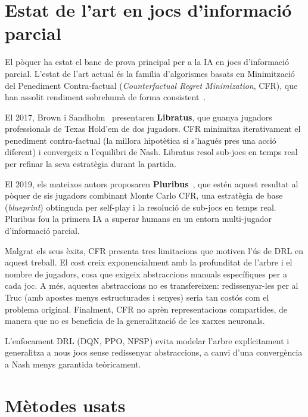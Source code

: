 \section{Estat de l'art en jocs d'informació parcial}
\label{sec:estat-art}

El pòquer ha estat el banc de prova principal per a la \ac{IA} en jocs
d'informació parcial. L'estat de l'art actual és la família d'algorismes basats
en Minimització del Penediment Contra-factual (\emph{Counterfactual Regret
Minimization}, CFR), que han assolit rendiment sobrehumà de forma
consistent~\cite{brown2018libratus,brown2019pluribus}.

El 2017, Brown i Sandholm~\cite{brown2018libratus} presentaren \textbf{Libratus},
que guanya jugadors professionals de Texas Hold'em de dos jugadors. CFR minimitza
iterativament el penediment contra-factual (la millora hipotètica si s'hagués
pres una acció diferent) i convergeix a l'equilibri de Nash. Libratus resol
sub-jocs en temps real per refinar la seva estratègia durant la partida.

El 2019, els mateixos autors proposaren \textbf{Pluribus}~\cite{brown2019pluribus},
que estén aquest resultat al pòquer de sis jugadors combinant Monte Carlo CFR, una
estratègia de base (\emph{blueprint}) obtinguda per self-play i la resolució
de sub-jocs en temps real. Pluribus fou la primera \ac{IA} a superar humans en
un entorn multi-jugador d'informació parcial.

Malgrat els seus èxits, CFR presenta tres limitacions que motiven l'ús de
\ac{DRL} en aquest treball. El cost creix exponencialment amb la profunditat
de l'arbre i el nombre de jugadors, cosa que exigeix abstraccions manuals
específiques per a cada joc. A més, aquestes abstraccions no es transfereixen:
redissenyar-les per al Truc (amb apostes menys estructurades i senyes) seria
tan costós com el problema original. Finalment, CFR no aprèn representacions
compartides, de manera que no es beneficia de la generalització de les xarxes
neuronals.

L'enfocament \ac{DRL} (DQN, PPO, NFSP) evita modelar l'arbre explícitament i
generalitza a nous jocs sense redissenyar abstraccions, a canvi d'una
convergència a Nash menys garantida teòricament.

\section{Mètodes usats}
\label{sec:metodes}

